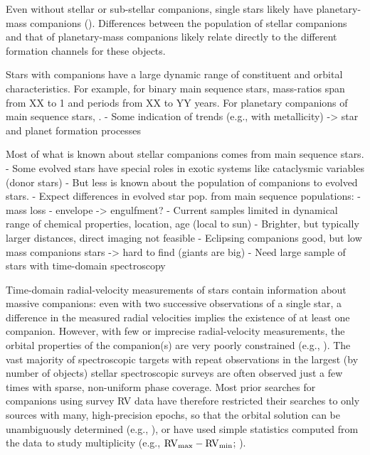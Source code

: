 \documentclass[modern, letterpaper]{aastex61}
\begin{document}
Even without stellar or sub-stellar companions, single stars likely have
planetary-mass companions (\citealt{todo}).
Differences between the population of stellar companions and that of
planetary-mass companions likely relate directly to the different formation
channels for these objects.

Stars with companions have a large dynamic range of constituent and orbital
characteristics.
For example, for binary main sequence stars, mass-ratios span from XX to 1 and
periods from XX to YY years.
For planetary companions of main sequence stars, \todo{}.
- Some indication of trends (e.g., with metallicity) -> star and
  planet formation processes

Most of what is known about stellar companions comes from main sequence stars.
- Some evolved stars have special roles in exotic systems like cataclysmic
  variables (donor stars)
- But less is known about the population of companions to evolved stars.
- Expect differences in evolved star pop. from main sequence populations:
  - mass loss
  - envelope -> engulfment?
- Current samples limited in dynamical range of chemical properties, location,
  age (local to sun)
- Brighter, but typically larger distances, direct imaging not feasible
- Eclipsing companions good, but low mass companions stars -> hard to find
  (giants are big)
- Need large sample of stars with time-domain spectroscopy

Time-domain radial-velocity measurements of stars contain information about
massive companions: even with two successive observations of a single star, a
difference in the measured radial velocities implies the existence of at least
one companion.
However, with few or imprecise radial-velocity measurements, the orbital
properties of the companion(s) are very poorly constrained (e.g.,
\citealt{Price-Whelan:2017}).
The vast majority of spectroscopic targets with repeat observations in the
largest (by number of objects) stellar spectroscopic surveys are often observed
just a few times with sparse, non-uniform phase coverage.
Most prior searches for companions using survey RV data have therefore
restricted their searches to only sources with many, high-precision epochs, so
that the orbital solution can be unambiguously determined (e.g.,
\citealt{Troup:2016}), or have used simple statistics computed from the data to
study multiplicity (e.g., ${\rm RV}_{\rm max} - {\rm RV}_{\rm min}$;
\citealt{Badenes:2017}).
\end{document}
